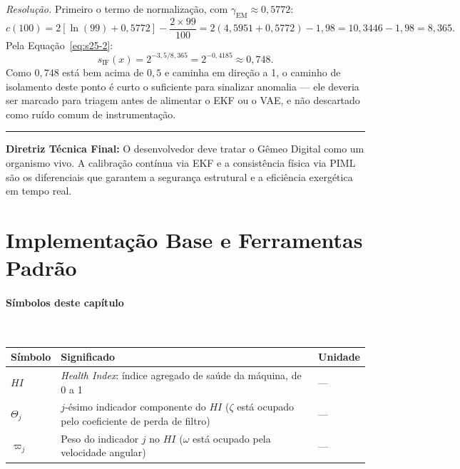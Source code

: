 \documentclass[12pt,a4paper]{article}
\numberwithin{equation}{section}
\numberwithin{table}{section}
\numberwithin{figure}{section}
\begin{document}
	\emph{Resolução.} Primeiro o termo de normalização, com
	$\gamma_{\text{EM}} \approx 0{,}5772$:
	$$c(100) = 2\left[\ln(99) + 0{,}5772\right] - \frac{2 \times 99}{100}
	= 2(4{,}5951+0{,}5772) - 1{,}98 = 10{,}3446 - 1{,}98 = 8{,}365.$$
	Pela Equação~\eqref{eq:s25-2}:
	$$s_{\text{IF}}(x) = 2^{-3{,}5/8{,}365} = 2^{-0{,}4185} \approx
	0{,}748.$$
	Como $0{,}748$ está bem acima de $0{,}5$ e caminha em direção a 1,
	o caminho de isolamento deste ponto é curto o suficiente para
	sinalizar anomalia --- ele deveria ser marcado para triagem antes de
	alimentar o EKF ou o VAE, e não descartado como ruído comum de
	instrumentação.

	\vspace{1em}
	\hrule
	\vspace{1em}

	\textbf{Diretriz Técnica Final:} O desenvolvedor deve tratar o Gêmeo Digital como um organismo vivo. A calibração contínua via EKF e a consistência física via PIML são os diferenciais que garantem a segurança estrutural e a eficiência exergética em tempo real.
	
	\newpage

	\clearpage
	\section{Implementação Base e Ferramentas Padrão}

\paragraph{Símbolos deste capítulo}\mbox{}\\[-0.5em]
{\small
\begin{longtable}{>{\raggedright\arraybackslash}p{2.6cm} >{\raggedright\arraybackslash}p{9.2cm} >{\raggedright\arraybackslash}p{2.6cm}}
	\toprule
	\textbf{Símbolo} & \textbf{Significado} & \textbf{Unidade} \\ \midrule
	\endhead
	$HI$ & \textit{Health Index}: índice agregado de saúde da máquina, de 0 a 1 & --- \\
	$\Theta_j$\dag & $j$-ésimo indicador componente do $HI$ ($\zeta$ está ocupado pelo coeficiente de perda de filtro) & --- \\
	$\varpi_j$\dag & Peso do indicador $j$ no $HI$ ($\omega$ está ocupado pela velocidade angular) & --- \\
	\bottomrule
\end{longtable}
}
\end{document}
